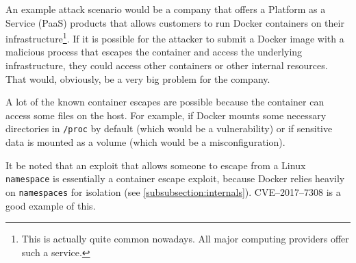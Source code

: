 An example attack scenario would be a company that offers a Platform as a Service (PaaS) products that allows customers to run Docker containers on their infrastructure\footnote{This is actually quite common nowadays. All major computing providers offer such a service.}. If it is possible for the attacker to submit a Docker image with a malicious process that escapes the container and access the underlying infrastructure, they could access other containers or other internal resources. That would, obviously, be a very big problem for the company.

\medskip

A lot of the known container escapes are possible because the container can access some files on the host. For example, if Docker mounts some necessary directories in \lstinline{/proc} by default (which would be a vulnerability) or if sensitive data is mounted as a volume (which would be a misconfiguration).

\medskip

It be noted that an exploit that allows someone to escape from a Linux \lstinline{namespace} is essentially a container escape exploit, because Docker relies heavily on \lstinline{namespaces} for isolation (see \autoref{subsubsection:internals}). CVE--2017--7308\cite{CVE-2017-7308} is a good example of this.

